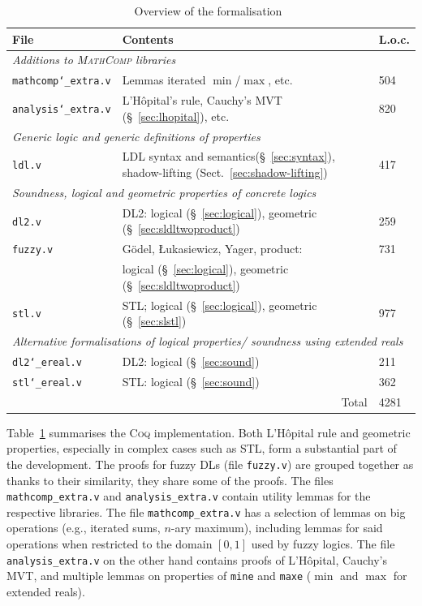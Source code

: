 \documentclass[a4paper,UKenglish,cleveref, autoref, thm-restate]{lipics-v2021}
\def\us{\char`\_}
\def\coqin#1{\texttt{#1}}
\def\DLtwo{\textrm{DL2}}
\def\STL{\textrm{STL}}
\def\product{\textrm{product}}
\def\Yager{\textrm{Yager}}
\def\Luka{\textrm{Łukasiewicz}}
\def\Godel{\textrm{Gödel}}
\def\coq{\textsc{Coq}}
\def\mathcomp{\textsc{MathComp}}
\begin{document}
\begin{table}
\centering
\begin{tabular}{lll}
File & Contents & L.o.c. \\
\hline
\multicolumn{3}{|l|}{\it Additions to \mathcomp{} libraries} \\
\hline
{\tt mathcomp\us{}extra.v} & Lemmas iterated $\min$/$\max$, etc. & 504 \\
{\tt analysis\us{}extra.v} & L'H\^opital's rule, Cauchy's MVT (\S~\ref{sec:lhopital}), etc. & 820 \\
\hline
\multicolumn{3}{|l|}{\it Generic logic and generic definitions of properties } \\
\hline
{\tt ldl.v} & LDL syntax and semantics(\S~\ref{sec:syntax}), shadow-lifting (Sect.~\ref{sec:shadow-lifting}) & 417 \\
\hline
\multicolumn{3}{|l|}{{\it Soundness, logical and geometric properties of concrete logics}} \\
\hline
{\tt dl2.v} & \DLtwo{}: logical (\S~\ref{sec:logical}), geometric (\S~\ref{sec:sldltwoproduct}) & 259  \\
{\tt fuzzy.v} & \Godel, \Luka, \Yager, \product:  & 731  \\
& logical (\S~\ref{sec:logical}), geometric (\S~\ref{sec:sldltwoproduct}) & \\
{\tt stl.v} & \STL{}; logical (\S~\ref{sec:logical}), geometric (\S~\ref{sec:slstl}) & 977 \\
\hline
\multicolumn{3}{|l|}{{\it Alternative formalisations of logical properties/ 
soundness using extended reals }} \\
\hline
{\tt dl2\us{}ereal.v} & \DLtwo{}: logical (\S~\ref{sec:sound}) & 211\\
{\tt stl\us{}ereal.v} & \STL{}: logical (\S~\ref{sec:sound})& 362\\
& \multicolumn{1}{r}{Total} & 4281 \\
\end{tabular}
\caption{Overview of the formalisation~\cite{github}}
\label{tab:overview}
\end{table}

Table~\ref{tab:overview} summarises the \coq{} implementation. 
Both L'Hôpital rule and geometric properties, especially in complex cases such 
as \STL{}, form a substantial part of the development. 
%
The proofs for fuzzy DLs (file \coqin{fuzzy.v}) are grouped together as
thanks to their similarity, they share some of the proofs. The files
\coqin{mathcomp_extra.v} and \coqin{analysis_extra.v} contain utility
lemmas for the respective libraries. The file \coqin{mathcomp_extra.v}
has a selection of lemmas on big operations (e.g., iterated sums, $n$-ary
maximum), including lemmas for said operations when restricted to the
domain $[0,1]$ used by fuzzy logics. The file \coqin{analysis_extra.v}
on the other hand contains proofs of L'Hôpital, Cauchy's MVT, and
multiple lemmas on properties of \coqin{mine} and \coqin{maxe} ($\min$
and $\max$ for extended reals).
\end{document}
